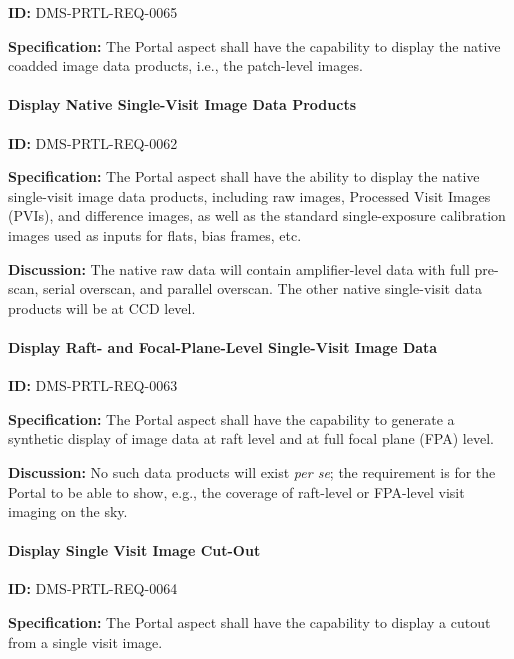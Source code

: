 \documentclass[SE,toc,lsstdraft]{lsstdoc}
\begin{document}
\label{DMS-PRTL-REQ-0065}
\textbf{ID:} DMS-PRTL-REQ-0065

\textbf{Specification:}
The Portal aspect shall have the capability to display the native coadded image data products, i.e., the patch-level images.

\paragraph{Display Native Single-Visit Image Data Products}\hfill  %

\label{DMS-PRTL-REQ-0062}
\textbf{ID:} DMS-PRTL-REQ-0062

\textbf{Specification:}
The Portal aspect shall have the ability to display the native single-visit image data products, including raw images, Processed Visit Images (PVIs), and difference images, as well as the standard single-exposure calibration images used as inputs for flats, bias frames, etc.

\textbf{Discussion:}
The native raw data will contain amplifier-level data with full pre-scan, serial overscan, and parallel overscan.
The other native single-visit data products will be at CCD level.

\paragraph{Display Raft- and Focal-Plane-Level Single-Visit  Image Data}\hfill  %

\label{DMS-PRTL-REQ-0063}
\textbf{ID:} DMS-PRTL-REQ-0063

\textbf{Specification:}
The Portal aspect shall have the capability to generate a synthetic display of image data at raft level and at full focal plane (FPA) level.

\textbf{Discussion:}
No such data products will exist \textit{per se}; the requirement is for the Portal to be able to show, e.g., the coverage of raft-level or FPA-level visit imaging on the sky.

\paragraph{Display Single Visit Image Cut-Out}\hfill  %

\label{DMS-PRTL-REQ-0064}
\textbf{ID:} DMS-PRTL-REQ-0064

\textbf{Specification:}
The Portal aspect shall have the capability to display a cutout from a single visit image.
\end{document}
